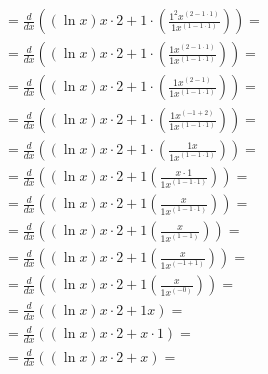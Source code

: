 \documentclass{article}
\begin{document}
\begin{gather*}
={{\frac{{d}}{{d{{x}}}}}{{\left({{\left(\ln{{x}}\right)}{{x}{\cdot}{2}}}+{{1}{\cdot}{\left(\frac{{{{1}^{2}}{{x}^{\left({2}-{{1}{\cdot}{1}}\right)}}}}{{{1}{{x}^{\left({1}-{{1}{\cdot}{1}}\right)}}}}\right)}}\right)}}}=\\
={{\frac{{d}}{{d{{x}}}}}{{\left({{\left(\ln{{x}}\right)}{{x}{\cdot}{2}}}+{{1}{\cdot}{\left(\frac{{{1}{{x}^{\left({2}-{{1}{\cdot}{1}}\right)}}}}{{{1}{{x}^{\left({1}-{{1}{\cdot}{1}}\right)}}}}\right)}}\right)}}}=\\
={{\frac{{d}}{{d{{x}}}}}{{\left({{\left(\ln{{x}}\right)}{{x}{\cdot}{2}}}+{{1}{\cdot}{\left(\frac{{{1}{{x}^{\left({2}-{1}\right)}}}}{{{1}{{x}^{\left({1}-{{1}{\cdot}{1}}\right)}}}}\right)}}\right)}}}=\\
={{\frac{{d}}{{d{{x}}}}}{{\left({{\left(\ln{{x}}\right)}{{x}{\cdot}{2}}}+{{1}{\cdot}{\left(\frac{{{1}{{x}^{\left({-{1}}+{2}\right)}}}}{{{1}{{x}^{\left({1}-{{1}{\cdot}{1}}\right)}}}}\right)}}\right)}}}=\\
={{\frac{{d}}{{d{{x}}}}}{{\left({{\left(\ln{{x}}\right)}{{x}{\cdot}{2}}}+{{1}{\cdot}{\left(\frac{{{1}{x}}}{{{1}{{x}^{\left({1}-{{1}{\cdot}{1}}\right)}}}}\right)}}\right)}}}=\\
={{\frac{{d}}{{d{{x}}}}}{{\left({{\left(\ln{{x}}\right)}{{x}{\cdot}{2}}}+{{1}{\left(\frac{{{x}{\cdot}{1}}}{{{1}{{x}^{\left({1}-{{1}{\cdot}{1}}\right)}}}}\right)}}\right)}}}=\\
={{\frac{{d}}{{d{{x}}}}}{{\left({{\left(\ln{{x}}\right)}{{x}{\cdot}{2}}}+{{1}{\left(\frac{{x}}{{{1}{{x}^{\left({1}-{{1}{\cdot}{1}}\right)}}}}\right)}}\right)}}}=\\
={{\frac{{d}}{{d{{x}}}}}{{\left({{\left(\ln{{x}}\right)}{{x}{\cdot}{2}}}+{{1}{\left(\frac{{x}}{{{1}{{x}^{\left({1}-{1}\right)}}}}\right)}}\right)}}}=\\
={{\frac{{d}}{{d{{x}}}}}{{\left({{\left(\ln{{x}}\right)}{{x}{\cdot}{2}}}+{{1}{\left(\frac{{x}}{{{1}{{x}^{\left({-{1}}+{1}\right)}}}}\right)}}\right)}}}=\\
={{\frac{{d}}{{d{{x}}}}}{{\left({{\left(\ln{{x}}\right)}{{x}{\cdot}{2}}}+{{1}{\left(\frac{{x}}{{{1}{{x}^{\left(-{0}\right)}}}}\right)}}\right)}}}=\\
={{\frac{{d}}{{d{{x}}}}}{{\left({{\left(\ln{{x}}\right)}{{x}{\cdot}{2}}}+{{1}{x}}\right)}}}=\\
={{\frac{{d}}{{d{{x}}}}}{{\left({{\left(\ln{{x}}\right)}{{x}{\cdot}{2}}}+{{x}{\cdot}{1}}\right)}}}=\\
={{\frac{{d}}{{d{{x}}}}}{{\left({{\left(\ln{{x}}\right)}{{x}{\cdot}{2}}}+{x}\right)}}}=\\

\end{gather*}
\end{document}
